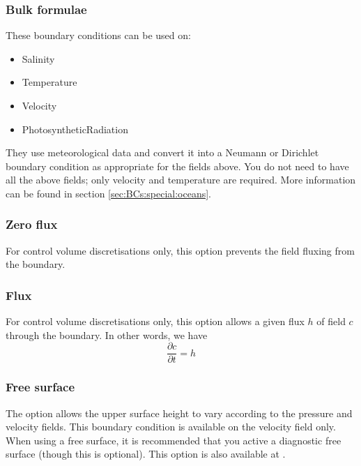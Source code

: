 \subsubsection{Bulk formulae}\label{sec:bulk_formulae}

These boundary conditions can be used on:
\begin{itemize}
\item Salinity
\item Temperature
\item Velocity
\item PhotosyntheticRadiation
\end{itemize}

They use meteorological data and convert it into a Neumann or Dirichlet boundary condition
as appropriate for the fields above. You do not need to have all the above fields; only 
velocity and temperature are required. More information can be found in section \ref{sec:BCs:special:oceans}.

\subsubsection{Zero flux}

For control volume discretisations only, this option prevents the field fluxing from the boundary.

\subsubsection{Flux}

For control volume discretisations only, this option allows a given flux $h$ of field $c$ through the boundary. In other words, we have
\begin{equation*}
   \frac{\partial c}{\partial t} = h
\end{equation*}

\subsubsection{Free surface}\label{subsec:free_surface_bc}

The  option allows the upper surface height to vary according to the pressure and velocity fields. This boundary condition is available on the velocity field only. When using a free surface, it is recommended that you active a diagnostic free surface (though this is optional). This option is also available at . 

